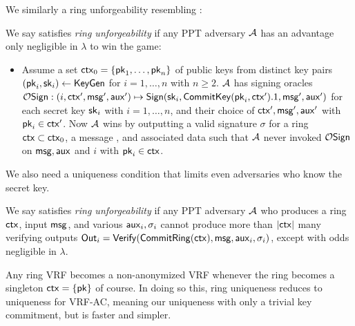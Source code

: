 We similarly a ring unforgeability resembling
 \cite[pp. 7 Def. 7]{cryptoeprint:2005:304}:

\begin{definition}
We say \rVRF satisfies {\em ring unforgeability} if
any PPT adversary $\mathcal{A}$ has an advantage only
 negligible in $\lambda$ to win the game:
\begin{itemize}
\item[]
 Assume a set $\mathsf{ctx}_0 = \{ \mathsf{pk}_1,\ldots,\mathsf{pk}_n \}$ of public keys from
 distinct key pairs $(\mathsf{pk}_i,\mathsf{sk}_i) \leftarrow {\ensuremath{\mathsf{KeyGen}}}$ for $i=1,\ldots,n$ with $n \ge 2$.
 $\mathcal{A}$ has signing oracles
 $\mathcal{O}\mathsf{Sign} : (i,\mathsf{ctx}',\mathsf{msg}',\mathsf{aux}') \mapsto
  {\ensuremath{\mathsf{Sign}}}(\mathsf{sk}_i,{\mathsf{CommitKey}}(\mathsf{pk}_i,\mathsf{ctx}').1,\mathsf{msg}',\mathsf{aux}')$
 for each secret key $\mathsf{sk}_i$ with $i=1,\ldots,n$, and
  their choice of $\mathsf{ctx}',\mathsf{msg}',\mathsf{aux}'$ with $\mathsf{pk}_i \in \mathsf{ctx}'$.
 Now $\mathcal{A}$ wins by outputting a valid signature $\sigma$ for
 a ring $\mathsf{ctx} \subset \mathsf{ctx}_0$, a message \msg, and associated data \aux
 such that
 $\mathcal{A}$ never invoked $\mathcal{O}\mathsf{Sign}$ on $\mathsf{msg},\mathsf{aux}$ and $i$ with $\mathsf{pk}_i \in \mathsf{ctx}$.
\end{itemize}
\end{definition}

We also need a uniqueness condition that limits even adversaries who know the secret key.


\begin{definition}
We say \rVRF satisfies {\em ring unforgeability} if
any PPT adversary $\mathcal{A}$ who produces
 a ring $\mathsf{ctx}$, input $\mathsf{msg}$,  and various $\mathsf{aux}_i,\sigma_i$
cannot produce more than $|\mathsf{ctx}|$ many verifying outputs
${\mathsf{Out}}_i = {\mathsf{Verify}}({\mathsf{CommitRing}}(\mathsf{ctx}),\mathsf{msg},\mathsf{aux}_i,\sigma_i)$,
 except with odds negligible in $\lambda$.
\end{definition}

Any ring VRF becomes a non-anonymized VRF whenever
 the ring becomes a singleton $\mathsf{ctx} = \{ \mathsf{pk} \}$ of course.
In doing so this, ring uniqueness reduces to uniqueness for VRF-AC,
meaning our uniqueness with only a trivial key commitment,
but \ThinVRF is faster and simpler.

